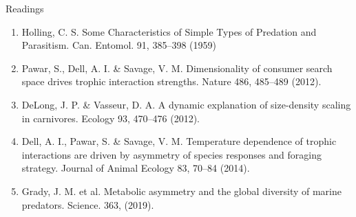   
  \begin{frame}{Readings}
  
  \begin{enumerate}\setlength{\itemindent}{-2em}\itemsep3pt
  
    \item Holling, C. S. Some Characteristics of Simple Types of Predation and Parasitism. Can. Entomol. 91, 385--398 (1959)
    
    \item Pawar, S., Dell, A. I. \& Savage, V. M. Dimensionality of consumer search space drives trophic interaction strengths. Nature 486, 485--489 (2012).
  
  \item DeLong, J. P. \& Vasseur, D. A. A dynamic explanation of size-density scaling in carnivores. Ecology 93, 470--476 (2012).

  \item Dell, A. I., Pawar, S. \& Savage, V. M. Temperature dependence of trophic interactions are driven by asymmetry of species responses and foraging strategy. Journal of Animal Ecology 83, 70--84 (2014).
  
  \item Grady, J. M. et al. Metabolic asymmetry and the global diversity of marine predators. Science. 363, (2019).
    
  \end{enumerate}
  
\end{frame}



